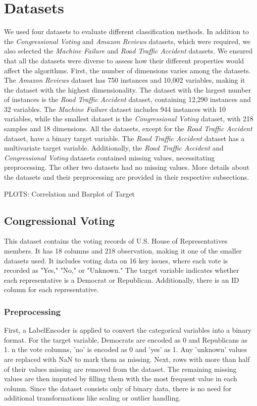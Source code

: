 \documentclass{article}
\begin{document}
\section{Datasets}
We used four datasets to evaluate different classification methods. In addition to the \textit{Congressional Voting} and \textit{Amazon Reviews} datasets, which were required, we also selected the \textit{Machine Failure} and \textit{Road Traffic Accident} datasets. We ensured that all the datasets were diverse to assess how their different properties would affect the algorithms. \newline
First, the number of dimensions varies among the datasets. The \textit{Amazon Reviews} dataset has 750 instances and 10,002 variables, making it the dataset with the highest dimensionality. The dataset with the largest number of instances is the \textit{Road Traffic Accident} dataset, containing 12,290 instances and 32 variables. The \textit{Machine Failure} dataset includes 944 instances with 10 variables, while the smallest dataset is the \textit{Congressional Voting} dataset, with 218 samples and 18 dimensions.\newline
All the datasets, except for the \textit{Road Traffic Accident} dataset, have a binary target variable. The \textit{Road Traffic Accident} dataset has a multivariate target variable. Additionally, the \textit{Road Traffic Accident} and \textit{Congressional Voting} datasets contained missing values, necessitating preprocessing. The other two datasets had no missing values.\newline
More details about the datasets and their preprocessing are provided in their respective subsections.

PLOTS: Correlation and Barplot of Target

\subsection{Congressional Voting}
This dataset contains the voting records of U.S. House of Representatives members. It has 18 columns and 218 observation, making it one of the smaller datasets used. It includes voting data on 16 key issues, where each vote is recorded as "Yes," "No," or "Unknown." The target variable indicates whether each representative is a Democrat or Republican. Additionally, there is an ID column for each representative.


\subsubsection{Preprocessing}
First, a LabelEncoder is applied to convert the categorical variables into a binary format.  For the target variable, Democrats are encoded as 0 and Republicans as 1.  n the vote columns, 'no' is encoded as 0 and 'yes' as 1. Any 'unknown' values are replaced with NaN to mark them as missing. Next, rows with more than half of their values missing are removed from the dataset. The remaining missing values are then imputed by filling them with the most frequent value in each column. Since the dataset consists only of binary data, there is no need for additional transformations like scaling or outlier handling. 
\end{document}
